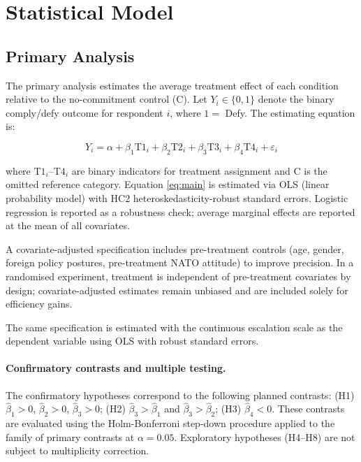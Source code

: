 \section{Statistical Model}
\label{sec:model}

\subsection{Primary Analysis}

The primary analysis estimates the average treatment effect of each condition relative to the no-commitment control (C). Let $Y_i \in \{0, 1\}$ denote the binary comply/defy outcome for respondent $i$, where $1 =$ Defy. The estimating equation is:

\begin{equation}
    Y_i = \alpha + \beta_1 \text{T1}_i + \beta_2 \text{T2}_i + \beta_3 \text{T3}_i + \beta_4 \text{T4}_i + \varepsilon_i
    \label{eq:main}
\end{equation}

where $\text{T1}_i$--$\text{T4}_i$ are binary indicators for treatment assignment and C is the omitted reference category. Equation \eqref{eq:main} is estimated via OLS (linear probability model) with HC2 heteroskedasticity-robust standard errors. Logistic regression is reported as a robustness check; average marginal effects are reported at the mean of all covariates.

A covariate-adjusted specification includes pre-treatment controls (age, gender, foreign policy postures, pre-treatment NATO attitude) to improve precision. In a randomised experiment, treatment is independent of pre-treatment covariates by design; covariate-adjusted estimates remain unbiased and are included solely for efficiency gains.

The same specification is estimated with the continuous escalation scale as the dependent variable using OLS with robust standard errors.

\paragraph{Confirmatory contrasts and multiple testing.}
The confirmatory hypotheses correspond to the following planned contrasts: (H1) $\hat{\beta}_1 > 0$, $\hat{\beta}_2 > 0$, $\hat{\beta}_3 > 0$; (H2) $\hat{\beta}_3 > \hat{\beta}_1$ and $\hat{\beta}_3 > \hat{\beta}_2$; (H3) $\hat{\beta}_4 < 0$. These contrasts are evaluated using the Holm-Bonferroni step-down procedure applied to the family of primary contrasts at $\alpha = 0.05$. Exploratory hypotheses (H4--H8) are not subject to multiplicity correction.

